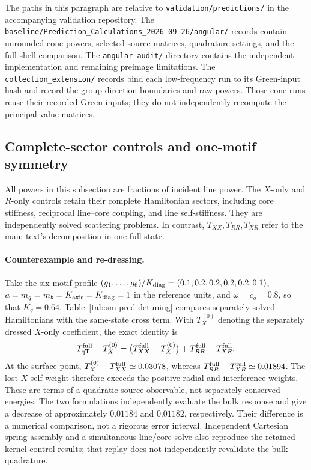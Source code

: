 \documentclass[10pt,aps,onecolumn,notitlepage,nofootinbib]{revtex4-2}
\newcommand{\qT}{\mathrm{qT}}
\begin{document}
The paths in this paragraph are relative to \nolinkurl{validation/predictions/} in the accompanying validation repository. The \nolinkurl{baseline/Prediction_Calculations_2026-09-26/angular/} records contain unrounded cone powers, selected source matrices, quadrature settings, and the full-shell comparison. The \nolinkurl{angular_audit/} directory contains the independent implementation and remaining preimage limitations. The \nolinkurl{collection_extension/} records bind each low-frequency run to its Green-input hash and record the group-direction boundaries and raw powers. Those cone runs reuse their recorded Green inputs; they do not independently recompute the principal-value matrices.

\subsection{Complete-sector controls and one-motif symmetry}
\label{sec:sm-pred-sector-controls}

All powers in this subsection are fractions of incident line power. The $X$-only and $R$-only controls retain their complete Hamiltonian sectors, including core stiffness, reciprocal line--core coupling, and line self-stiffness. They are independently solved scattering problems. In contrast, $T_{XX},T_{RR},T_{XR}$ refer to the main text's decomposition in one full state.

\paragraph*{Counterexample and re-dressing.}
Take the six-motif profile $(g_1,\ldots,g_6)/K_{\rm diag}=(0.1,0.2,0.2,0.2,0.2,0.1)$, $a=m_q=m_b=K_{\rm axis}=K_{\rm diag}=1$ in the reference units, and $\omega=c_q=0.8$, so that $K_q=0.64$. Table~\ref{tab:sm-pred-detuning} compares separately solved Hamiltonians with the same-state cross term. With $T_X^{(0)}$ denoting the separately dressed $X$-only coefficient, the exact identity is
\begin{equation}
 T_{\qT}^{\rm full}-T_X^{(0)}
 =\bigl(T_{XX}^{\rm full}-T_X^{(0)}\bigr)
 +T_{RR}^{\rm full}+T_{XR}^{\rm full}.
 \label{eq:sm-pred-redressing}
\end{equation}
At the surface point, $T_X^{(0)}-T_{XX}^{\rm full}\simeq0.03078$, whereas $T_{RR}^{\rm full}+T_{XR}^{\rm full}\simeq0.01894$. The lost $X$ self weight therefore exceeds the positive radial and interference weights. These are terms of a quadratic source observable, not separately conserved energies. The two formulations independently evaluate the bulk response and give a decrease of approximately $0.01184$ and $0.01182$, respectively. Their difference is a numerical comparison, not a rigorous error interval. Independent Cartesian spring assembly and a simultaneous line/core solve also reproduce the retained-kernel control results; that replay does not independently revalidate the bulk quadrature.
\end{document}
